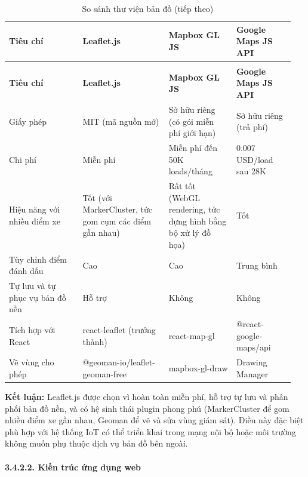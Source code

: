 \documentclass[a4paper]{extarticle}
\newcommand{\thesissettableid}[2]{%
  \renewcommand{\thetable}{#1}%
  \renewcommand{\theHtable}{#2}%
}
\begin{document}
{\thesissettableid{3.26}{tab-ch3-so-sanh-thu-vien-ban-o}
\def\LTcaptype{table}
\begin{longtable}{|L{0.248\linewidth}|L{0.285\linewidth}|L{0.229\linewidth}|L{0.192\linewidth}|}
\caption{So sánh thư viện bản đồ}\label{tab:ch3-so-sanh-thu-vien-ban-o}\\
\hline \textbf{Tiêu chí} & \textbf{Leaflet.js} & \textbf{Mapbox GL JS} & \textbf{Google Maps JS API} \\
\hline
\endfirsthead
\caption[]{So sánh thư viện bản đồ (tiếp theo)}\\
\hline \textbf{Tiêu chí} & \textbf{Leaflet.js} & \textbf{Mapbox GL JS} & \textbf{Google Maps JS API} \\
\hline
\endhead
\hline
\endfoot
\endlastfoot
Giấy phép & MIT (mã nguồn mở) & Sở hữu riêng (có gói miễn phí giới hạn) & Sở hữu riêng
(trả phí) \\\hline
Chi phí & Miễn phí & Miễn phí đến 50K loads/tháng & 0.007 USD/load sau
28K \\\hline
Hiệu năng với nhiều điểm xe & Tốt (với MarkerCluster, tức gom cụm các điểm gần nhau) & Rất tốt (WebGL
rendering, tức dựng hình bằng bộ xử lý đồ họa) & Tốt \\\hline
Tùy chỉnh điểm đánh dấu & Cao & Cao & Trung bình \\\hline
Tự lưu và tự phục vụ bản đồ nền & Hỗ trợ & Không & Không \\\hline
Tích hợp với React & react-leaflet (trưởng thành) & react-map-gl &
@react-google-maps/api \\\hline
Vẽ vùng cho phép & @geoman-io/leaflet-geoman-free & mapbox-gl-draw & Drawing
Manager \\\hline
\end{longtable}
}


\textbf{Kết luận:} Leaflet.js được chọn vì hoàn toàn miễn phí, hỗ trợ tự
lưu và phân phối bản đồ nền, và có hệ sinh thái plugin phong phú
(MarkerCluster để gom nhiều điểm xe gần nhau, Geoman để vẽ và sửa vùng giám sát).
Điều này đặc biệt phù hợp với hệ thống IoT có thể triển khai trong mạng
nội bộ hoặc môi trường không muốn phụ thuộc dịch vụ bản đồ bên ngoài.

\clearpage

\paragraph{3.4.2.2. Kiến trúc ứng dụng web}\label{3242-kiux1ebfn-truxfac-ux1ee9ng-dux1ee5ng-web-web-application-architecture}
\end{document}
